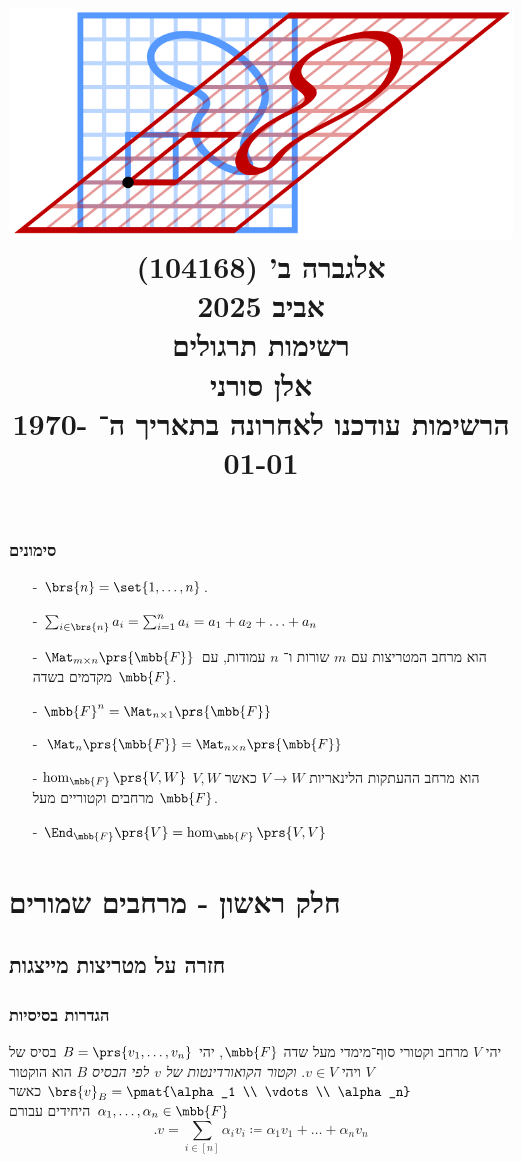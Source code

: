\documentclass[a4paper,10pt,twoside,openany]{book}
\title{
\includegraphics[width=6in]{images/front.png}\\
\vspace{30pt}
\Huge
אלגברה ב' (104168)
\\
אביב 2025
\\
רשימות תרגולים
\vspace{30pt}
\\
\huge
אלן סורני
\vspace{30pt}
\\
\Large
הרשימות עודכנו לאחרונה בתאריך ה־%
\today
}
\date{}
\begin{document}
\frontmatter
\maketitle
\tableofcontents

\mainmatter

\section*{סימונים}

\begin{itemize}
\item[-]
$\brs{n} = \set{1, \ldots, n}$.
\item[-]
$\sum_{i \in \brs{n}} a_i = \sum_{i=1}^n a_i = a_1 + a_2 + \ldots + a_n$
\item[-] $\Mat_{m \times n}\prs{\mbb{F}}$ הוא מרחב המטריצות עם
$m$
שורות ו־%
$n$
עמודות, עם מקדמים בשדה
$\mbb{F}$.
\item[-]
$\mbb{F}^n = \Mat_{n \times 1}\prs{\mbb{F}}$
\item[-]
$\Mat_{n}\prs{\mbb{F}} = \Mat_{n \times n}\prs{\mbb{F}}$
\item[-]
$\hom_{\mbb{F}}\prs{V,W}$
הוא מרחב ההעתקות הלינאריות
$V \to W$
כאשר
$V,W$
מרחבים וקטוריים מעל
$\mbb{F}$.
\item[-]
$\End_{\mbb{F}}\prs{V} = \hom_{\mbb{F}}\prs{V,V}$
\end{itemize}

\part{חלק ראשון - מרחבים שמורים}

\chapter{חזרה על מטריצות מייצגות}

\section{הגדרות בסיסיות}

\begin{definition}
יהי
$V$
מרחב וקטורי סוף־מימדי מעל שדה
$\mbb{F}$,
יהי
$B = \prs{v_1, \ldots, v_n}$
בסיס של
$V$
ויהי
$v \in V$.
\emph{וקטור הקואורדינטות של
$v$
לפי הבסיס
$B$}
הוא הוקטור
$\brs{v}_B = \pmat{\alpha_1 \\ \vdots \\ \alpha_n}$
כאשר
$\alpha_1, \ldots, \alpha_n \in \mbb{F}$
היחידים עבורם
\[\text{.}v = \sum_{i \in [n]} \alpha_i v_i \coloneqq \alpha_1 v_1 + \ldots + \alpha_n v_n\]
\end{definition}
\end{document}
